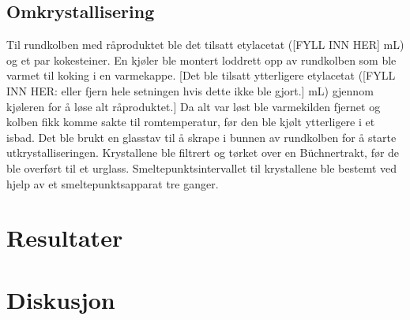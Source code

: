 \subsection{Omkrystallisering}
Til rundkolben med råproduktet ble det tilsatt etylacetat ([FYLL INN HER] \si{\milli\liter}) og et par kokesteiner. En kjøler ble montert loddrett opp av rundkolben som ble varmet til koking i en varmekappe. [Det ble tilsatt ytterligere etylacetat ([FYLL INN HER: eller fjern hele setningen hvis dette ikke ble gjort.] \si{\milli\liter}) gjennom kjøleren for å løse alt råproduktet.] Da alt var løst ble varmekilden fjernet og kolben fikk komme sakte til romtemperatur, før den ble kjølt ytterligere i et isbad. Det ble brukt en glasstav til å skrape i bunnen av rundkolben for å starte utkrystalliseringen. Krystallene ble filtrert og tørket over en Büchnertrakt, før de ble overført til et urglass. Smeltepunktsintervallet til krystallene ble bestemt ved hjelp av et smeltepunktsapparat tre ganger. 



\section{Resultater}

\section{Diskusjon}
